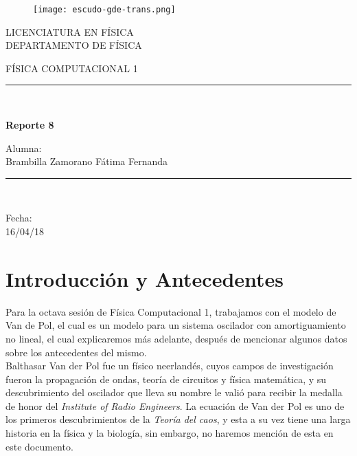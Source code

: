 \documentclass{article}
\begin{document}
\begin{titlepage}
\begin{center}
    \vspace*{-1in}
    \begin{figure}[htb]
    \begin{center}
    \texttt{[image: escudo-gde-trans.png]}
    \end{center}
\end{figure}
\begin{center}
LICENCIATURA EN FÍSICA \\
\vspace*{0.15in}
DEPARTAMENTO DE FÍSICA \\
\vspace*{0.6in}
\begin{large}
FÍSICA COMPUTACIONAL 1 \\
\end{large}
\vspace*{0.2in}
\rule{80mm}{0.1mm}\\
\vspace*{0.1in}
\begin{large}
\textbf{Reporte 8\\ }
\end{large}
\vspace*{0.3in}
\begin{large}
Alumna: \\
\vspace*{0.1in}
Brambilla Zamorano Fátima Fernanda\\
\end{large}
\vspace*{0.3in}
\rule{80mm}{0.1mm}\\
\vspace*{0.1in}
\begin{large}
Fecha: \\ 16/04/18\\
\end{large}
\end{center}
\end{center}
\end{titlepage}

\section {Introducción y Antecedentes}
Para la octava sesión de Física Computacional 1, trabajamos con el modelo de Van de Pol, el cual es un modelo para un sistema oscilador con amortiguamiento no lineal, el cual explicaremos más adelante, después de mencionar algunos datos sobre los antecedentes del mismo. \\
Balthasar Van der Pol fue un físico neerlandés, cuyos campos de investigación fueron la propagación de ondas, teoría de circuitos y física matemática, y su descubrimiento del oscilador que lleva su nombre le valió para recibir la medalla de honor del \textit{Institute of Radio Engineers}.
La ecuación de Van der Pol es uno de los primeros descubrimientos de la \textit{Teoría del caos}, y esta a su vez tiene una larga historia en la física y la biología, sin embargo, no haremos mención de esta en este documento.
\end{document}
